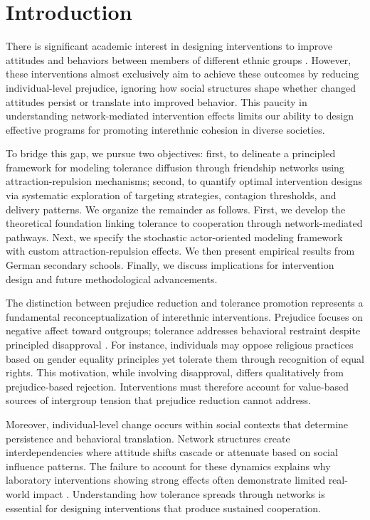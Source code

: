 \documentclass[12pt,a4paper]{article}
\begin{document}

\section{Introduction}

There is significant academic interest in designing interventions to improve attitudes and behaviors between members of different ethnic groups \citep{paluck2021prejudice}. However, these interventions almost exclusively aim to achieve these outcomes by reducing individual-level prejudice, ignoring how social structures shape whether changed attitudes persist or translate into improved behavior. This paucity in understanding network-mediated intervention effects limits our ability to design effective programs for promoting interethnic cohesion in diverse societies.

To bridge this gap, we pursue two objectives: first, to delineate a principled framework for modeling tolerance diffusion through friendship networks using attraction-repulsion mechanisms; second, to quantify optimal intervention designs via systematic exploration of targeting strategies, contagion thresholds, and delivery patterns. We organize the remainder as follows. First, we develop the theoretical foundation linking tolerance to cooperation through network-mediated pathways. Next, we specify the stochastic actor-oriented modeling framework with custom attraction-repulsion effects. We then present empirical results from German secondary schools. Finally, we discuss implications for intervention design and future methodological advancements.

The distinction between prejudice reduction and tolerance promotion represents a fundamental reconceptualization of interethnic interventions. Prejudice focuses on negative affect toward outgroups; tolerance addresses behavioral restraint despite principled disapproval \citep{verkuyten2023tolerance}. For instance, individuals may oppose religious practices based on gender equality principles yet tolerate them through recognition of equal rights. This motivation, while involving disapproval, differs qualitatively from prejudice-based rejection. Interventions must therefore account for value-based sources of intergroup tension that prejudice reduction cannot address.

Moreover, individual-level change occurs within social contexts that determine persistence and behavioral translation. Network structures create interdependencies where attitude shifts cascade or attenuate based on social influence patterns. The failure to account for these dynamics explains why laboratory interventions showing strong effects often demonstrate limited real-world impact \citep{paluck2021prejudice}. Understanding how tolerance spreads through networks is essential for designing interventions that produce sustained cooperation.
\end{document}
